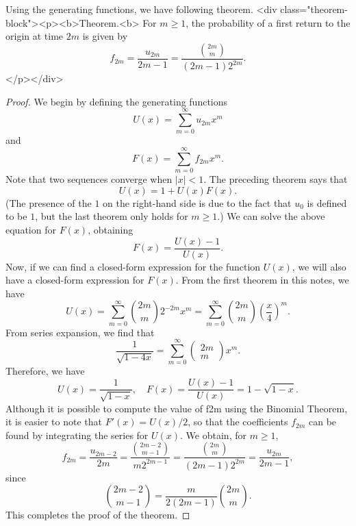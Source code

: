 Using the generating functions, we have following theorem.
<div class="theorem-block"><p><b>Theorem.<b> 
For $m \geq 1$, the probability of a first return to the origin at time
$2m$ is given by
$$\begin{equation}
    f_{2 m}=\frac{u_{2 m}}{2 m-1}=\frac{\binom{2m}{m}}{(2 m-1) 2^{2 m}}.
\end{equation}$$
</p></div>

\begin{proof}
We begin by defining the generating functions
$$\begin{equation}
    U(x)=\sum_{m=0}^{\infty} u_{2 m} x^{m}
\end{equation}$$
and 
$$\begin{equation}
    F(x)=\sum_{m=0}^{\infty} f_{2 m} x^{m}.
\end{equation}$$
Note that two sequences converge when $\left\vert x \right\vert<1$. The preceding theorem says that 
$$\begin{equation}
    U(x)=1+U(x) F(x).
\end{equation}$$
(The presence of the $1$ on the right-hand side is due to the fact that $u_0$ is defined to be $1$, but the last theorem only holds for $m \geq 1$.) We can solve the above equation for $F(x)$, obtaining
$$\begin{equation}
    F(x)=\frac{U(x)-1}{U(x)}.
\end{equation}$$
Now, if we can find a closed-form expression for the function $U(x)$, we will also have a closed-form expression for $F(x)$. From the first theorem in this notes, we have
$$\begin{equation}
    U(x)=\sum_{m=0}^{\infty}\binom{2m}{m} 2^{-2 m} x^{m} = \sum_{m=0}^\infty \binom{2m}{m} \left( \frac{x}{4} \right)^m.
\end{equation}$$
From series expansion, we find that 
$$\begin{equation}
    \frac{1}{\sqrt{1-4 x}}=\sum_{m=0}^{\infty}\left(\begin{array}{c}{2 m} \\ {m}\end{array}\right) x^{m}.
\end{equation}$$
Therefore, we have 
$$\begin{equation}
    U(x)=\frac{1}{\sqrt{1-x}}, \quad F(x) = \frac{U(x)-1}{U(x)} = 1-\sqrt{1-x}.
\end{equation}$$
Although it is possible to compute the value of f2m using the Binomial Theorem, it is easier to note that $F'(x) = U(x)/2$, so that the coefficients $f_{2m}$ can be found by integrating the series for $U(x)$. We obtain, for $m \geq 1$, 
$$\begin{equation}
    f_{2 m}=\frac{u_{2 m-2}}{2 m} = \frac{\binom{2m-2}{m-1}}{m 2^{2 m-1}} = \frac{\binom{2m}{m}}{(2 m-1) 2^{2 m}} = \frac{u_{2m}}{2m-1},
\end{equation}$$
since
$$\begin{equation}
    \binom{2m-2}{m-1} = \frac{m}{2(2 m-1)}\binom{2m}{m}.
\end{equation}$$
This completes the proof of the theorem.
\end{proof}

